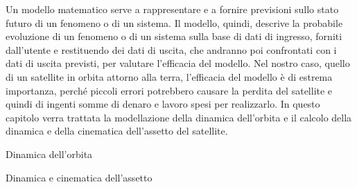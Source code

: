 Un modello matematico serve a rappresentare e a fornire previsioni sullo stato
futuro di un fenomeno o di un sistema. Il modello, quindi, descrive la probabile
evoluzione di un fenomeno o di un sistema sulla base di dati di ingresso,
forniti dall'utente e restituendo dei dati di uscita, che andranno poi
confrontati con i dati di uscita previsti, per valutare l'efficacia del modello.
Nel nostro caso, quello di un satellite in orbita attorno alla terra,
l'efficacia del modello è di estrema importanza, perché piccoli errori
potrebbero causare la perdita del satellite e quindi di ingenti somme di denaro
e lavoro spesi per realizzarlo. In questo capitolo verra trattata la
modellazione della dinamica dell'orbita e il calcolo della dinamica e della
cinematica dell'assetto del satellite.
\begin{section}{Dinamica dell'orbita}

\end{section}
\begin{section}{Dinamica e cinematica dell'assetto}

\end{section}